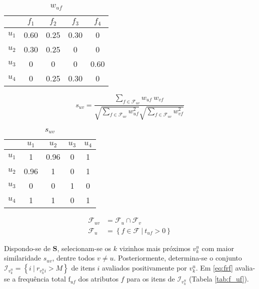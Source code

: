 \begin{table}[p]
\begin{center}
    \caption{$w_{uf}$}
    \label{tab:w_uf}
    \begin{tabular}{ | c | c | c | c | c | } 
    \hline
     & $f_1$ & $f_2$ & $f_3$ & $f_4$   \\ \hline
     $u_1$ & 0.60 & 0.25 & 0.30 & 0  \\ \hline
     $u_2$ & 0.30 & 0.25 & 0 & 0  \\ \hline
     $u_3$ & 0 & 0 & 0 & 0.60  \\ \hline
     $u_4$ & 0 & 0.25 & 0.30 & 0  \\ \hline
    \end{tabular}
\end{center}
\end{table}

\begin{equation}
\label{eq:suv}
    s_{uv} = \frac{\sum\limits_{f \in \mathcal{F}_{uv}}{w_{uf}~w_{vf}}}{\sqrt{\sum\limits_{f \in \mathcal{F}_{uv}
    }w_{uf}^2} \sqrt{\sum\limits_{f \in \mathcal{F}_{uv}}w_{vf}^2}} 
\end{equation} 

\begin{table}[p]
\begin{center}
    \caption{$s_{uv}$}
    \label{tab:s_uv}
    \begin{tabular}{ | c | c | c | c | c | } 
    \hline
     & $u_1$ & $u_2$ & $u_3$ & $u_4$   \\ \hline
     $u_1$ & 1 & 0.96 & 0 & 1  \\ \hline
     $u_2$ & 0.96 & 1 & 0 & 1  \\ \hline
     $u_3$ & 0 & 0 & 1 & 0  \\ \hline
     $u_4$ & 1 & 1 & 0 & 1  \\ \hline
    \end{tabular}
\end{center}
\end{table}

\begin{equation}
\label{eq:fuv}
\begin{split}
    \mathcal{F}_{uv} &= \mathcal{F}_u \cap \mathcal{F}_v \\
    \mathcal{F}_u &= \left\{ f \in \mathcal{F}~|~t_{uf} > 0 \right\}
\end{split}    
\end{equation} 

Dispondo-se de $\mathbf{S}$, selecionam-se os $k$ vizinhos mais próximos $v_k^u$ com maior similaridade $s_{uv}$, dentre todos $v \neq u$.  Posteriormente, determina-se o conjunto $\mathcal{I}_{v_k^u} = \left\{ i ~|~ r_{v_k^u i} > M\right\}$ de itens $i$ avaliados positivamente por $v_k^u$. Em \ref{eq:frf} avalia-se a frequência total $\mathrm{f}_{uf}$ dos atributos $f$ para os itens de $\mathcal{I}_{v_k^u}$ (Tabela \ref{tab:f_uf}). 

